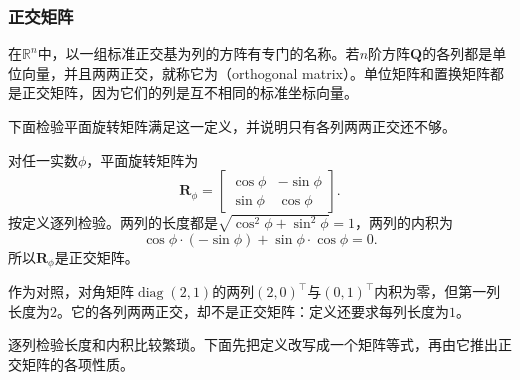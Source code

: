 \subsubsection{正交矩阵}
\label{sec:ls-orthogonal-matrices}
在$\mathbb R^n$中，以一组标准正交基为列的方阵有专门的名称。若$n$阶方阵$\bm Q$的各列都是单位向量，并且两两正交，就称它为（orthogonal matrix）。单位矩阵和置换矩阵都是正交矩阵，因为它们的列是互不相同的标准坐标向量。

下面检验平面旋转矩阵满足这一定义，并说明只有各列两两正交还不够。
\begin{example}[平面旋转是正交矩阵]
\label{ex:ls-rotation-orthogonal}
对任一实数$\phi$，平面旋转矩阵为
\[
 \bm R_\phi=\begin{bmatrix}\cos\phi&-\sin\phi\\\sin\phi&\cos\phi\end{bmatrix}.
\]
按定义逐列检验。两列的长度都是$\sqrt{\cos^2\phi+\sin^2\phi}=1$，两列的内积为
\[
 \cos\phi\cdot(-\sin\phi)+\sin\phi\cdot\cos\phi=0.
\]
所以$\bm R_\phi$是正交矩阵。

作为对照，对角矩阵$\operatorname{diag}(2,1)$的两列$(2,0)^\top$与$(0,1)^\top$内积为零，但第一列长度为$2$。它的各列两两正交，却不是正交矩阵：定义还要求每列长度为$1$。
\end{example}
逐列检验长度和内积比较繁琐。下面先把定义改写成一个矩阵等式，再由它推出正交矩阵的各项性质。

